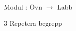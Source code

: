 
    Modul : Övn  $\rightarrow$ Labb \Alert{\texttt{--}}
    \begin{multicols}{3}\SlideFontTiny
    Repetera begrepp
    \end{multicols}
    